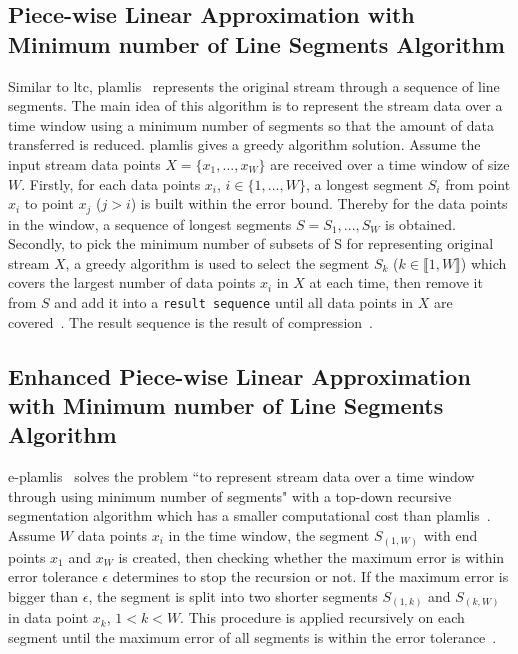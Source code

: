 \subsection{Piece-wise Linear Approximation
with Minimum number of Line Segments Algorithm}

Similar to \acrshort{ltc}, \acrfull{plamlis}~\cite{liu2007energy} represents the
original stream through a sequence of line segments. The main idea of this
algorithm is to represent the stream data over a time window using a minimum
number of segments so that the amount of data transferred is reduced.
\acrshort{plamlis} gives a greedy algorithm solution. Assume the input stream
data points $X=\{x_1, ..., x_W\}$ are received over a time window of size $W$.
Firstly, for each data points $x_i$, $i \in \{1, ..., W\}$, a longest segment
$S_{i}$ from point $x_i$ to point $x_j$ ($j>i$) is built within the error bound.
Thereby for the data points in the window, a sequence of longest segments $S =
{S_1, ..., S_W}$ is obtained. Secondly, to pick the minimum number of subsets of
S for representing original stream $X$, a greedy algorithm is used to select the
segment $S_k$ ($k \in \llbracket1, W\rrbracket$) which covers the largest number
of data points $x_i$ in $X$ at each time, then remove it from $S$ and add it
into a \texttt{result sequence} until all data points in $X$ are
covered~\cite{liu2007energy}. The result sequence is the result of
compression~\cite{zordan2012compress, zordan2014performance}.


\subsection{Enhanced Piece-wise Linear Approximation with Minimum number of Line
Segments Algorithm}

\acrfull{e-plamlis}~\cite{pham2008enhance} solves the problem ``to represent
stream data over a time window through using minimum number of segments" with a
top-down recursive segmentation algorithm which has a smaller computational cost
than \acrshort{plamlis}~\cite{pham2008enhance, zordan2014performance}. Assume
$W$ data points $x_i$ in the time window, the segment $S_{(1, W)}$ with end
points $x_1$ and $x_W$ is created, then checking whether the maximum error is
within error tolerance $\epsilon$ determines to stop the recursion or not. If
the maximum error is bigger than $\epsilon$, the segment is split into two
shorter segments $S_{(1, k)}$ and $S_{(k, W)}$ in data point $x_k$, $1<k<W$.
This procedure is applied recursively on each segment until the maximum error of
all segments is within the error tolerance~\cite{pham2008enhance,
zordan2014performance}.

